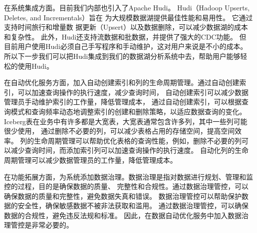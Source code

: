在系统集成方面。目前我们内部也引入了Apache Hudi。
Hudi（Hadoop Upserts, Deletes, and Incrementals）旨在
为大规模数据湖提供最佳性能和易用性。 它通过支持时间旅行和增量数
据更新（Upsert）以及数据删除，可以减少数据湖的成本和复杂性。
此外，Hudi还支持流数据和批数据，并提供了强大的CDC功能。
但目前用户使用Hudi必须自己手写程序和手动维护，这对用户来说是不小的成本。
所以下一步我们可以把Hudi集成到我们的数据湖分析系统中去，帮助用户能够轻松的使用Hudi。

在自动优化服务方面，加入自动创建索引和列的生命周期管理。通过自动创建索引，可以加速查询操作的执行速度，减少查询时间，
自动创建索引可以减少数据管理员手动维护索引的工作量，降低管理成本，
通过自动创建索引，可以根据查询模式和查询频率动态地调整索引的创建和删除策略，以适应数据查询的变化。
Iceberg表在业务中有许多都是大宽表，大宽表通常包含许多列，其中一些列可能很少使用，
通过删除不必要的列，可以减少表格占用的存储空间，提高空间效率。
列的生命周期管理可以帮助优化表格的查询性能，例如，删除不必要的列可以减少查询时间，而添加索引列可以加速查询操作的执行速度。
自动化列的生命周期管理可以减少数据管理员的工作量，降低管理成本。

在功能拓展方面，为系统添加数据治理。数据治理是指对数据进行规划、管理和监控的过程，目的是确保数据的质量、
完整性和合规性。通过数据治理管控，可以确保数据的质量和完整性，避免数据失真和错误。
数据治理管控可以帮助保护数据的安全性，确保敏感数据不被非法获取和滥用。
通过数据治理管控，可以确保数据的合规性，避免违反法规和标准。
因此，在数据自动优化服务中加入数据治理管控是非常必要的。

